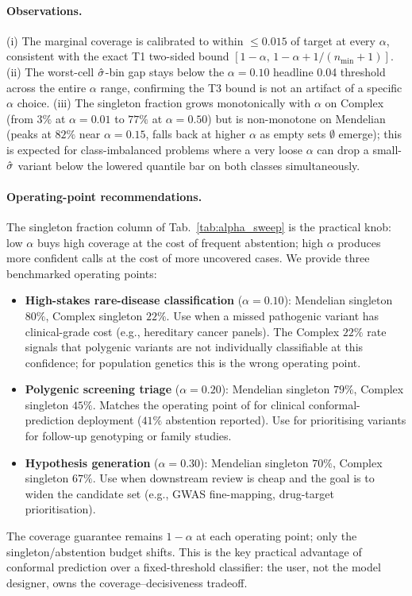\paragraph{Observations.}
(i) The marginal coverage is calibrated to within $\leq 0.015$ of target at every $\alpha$, consistent with the exact T1 two-sided bound $[1 - \alpha,\, 1 - \alpha + 1/(n_{\min}+1)]$. (ii) The worst-cell $\hat{\sigma}$-bin gap stays below the $\alpha = 0.10$ headline 0.04 threshold across the entire $\alpha$ range, confirming the T3 bound is not an artifact of a specific $\alpha$ choice. (iii) The singleton fraction grows monotonically with $\alpha$ on Complex (from $3\%$ at $\alpha = 0.01$ to $77\%$ at $\alpha = 0.50$) but is non-monotone on Mendelian (peaks at $82\%$ near $\alpha = 0.15$, falls back at higher $\alpha$ as empty sets $\emptyset$ emerge); this is expected for class-imbalanced problems where a very loose $\alpha$ can drop a small-$\hat{\sigma}$ variant below the lowered quantile bar on both classes simultaneously.

\paragraph{Operating-point recommendations.}
The singleton fraction column of Tab.~\ref{tab:alpha_sweep} is the practical knob: low $\alpha$ buys high coverage at the cost of frequent abstention; high $\alpha$ produces more confident calls at the cost of more uncovered cases. We provide three benchmarked operating points:

\begin{itemize}
    \item \textbf{High-stakes rare-disease classification} ($\alpha = 0.10$): Mendelian singleton $80\%$, Complex singleton $22\%$. Use when a missed pathogenic variant has clinical-grade cost (e.g., hereditary cancer panels). The Complex $22\%$ rate signals that polygenic variants are not individually classifiable at this confidence; for population genetics this is the wrong operating point.
    \item \textbf{Polygenic screening triage} ($\alpha = 0.20$): Mendelian singleton $79\%$, Complex singleton $45\%$. Matches the operating point of \citet{pcos2025conformal} for clinical conformal-prediction deployment ($41\%$ abstention reported). Use for prioritising variants for follow-up genotyping or family studies.
    \item \textbf{Hypothesis generation} ($\alpha = 0.30$): Mendelian singleton $70\%$, Complex singleton $67\%$. Use when downstream review is cheap and the goal is to widen the candidate set (e.g., GWAS fine-mapping, drug-target prioritisation).
\end{itemize}

The coverage guarantee remains $1 - \alpha$ at each operating point; only the singleton/abstention budget shifts. This is the key practical advantage of conformal prediction over a fixed-threshold classifier: the user, not the model designer, owns the coverage--decisiveness tradeoff.
